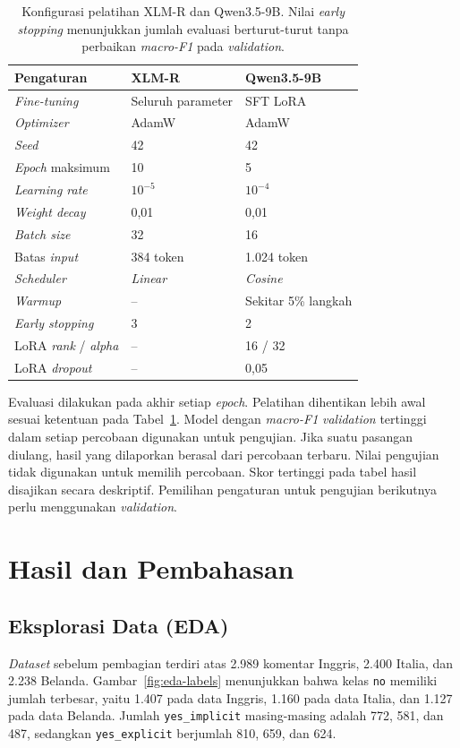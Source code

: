 \documentclass[11pt]{article}
\begin{document}
\begin{table}[t]
\centering
\small
\begin{tabular}{lll}
\toprule
Pengaturan & XLM-R & Qwen3.5-9B \\
\midrule
\textit{Fine-tuning} & Seluruh parameter & SFT LoRA \\
\textit{Optimizer} & AdamW & AdamW \\
\textit{Seed} & 42 & 42 \\
\textit{Epoch} maksimum & 10 & 5 \\
\textit{Learning rate} & $10^{-5}$ & $10^{-4}$ \\
\textit{Weight decay} & 0,01 & 0,01 \\
\textit{Batch size} & 32 & 16 \\
Batas \textit{input} & 384 token & 1.024 token \\
\textit{Scheduler} & \textit{Linear} & \textit{Cosine} \\
\textit{Warmup} & -- & Sekitar 5\% langkah \\
\textit{Early stopping} & 3 & 2 \\
LoRA \textit{rank} / \textit{alpha} & -- & 16 / 32 \\
LoRA \textit{dropout} & -- & 0,05 \\
\bottomrule
\end{tabular}
\caption{Konfigurasi pelatihan XLM-R dan Qwen3.5-9B. Nilai \textit{early stopping} menunjukkan jumlah evaluasi berturut-turut tanpa perbaikan \textit{macro-F1} pada \textit{validation}.}
\label{tab:configuration}
\end{table}

Evaluasi dilakukan pada akhir setiap \textit{epoch}. Pelatihan dihentikan lebih awal sesuai ketentuan pada Tabel~\ref{tab:configuration}. Model dengan \textit{macro-F1} \textit{validation} tertinggi dalam setiap percobaan digunakan untuk pengujian. Jika suatu pasangan diulang, hasil yang dilaporkan berasal dari percobaan terbaru. Nilai pengujian tidak digunakan untuk memilih percobaan. Skor tertinggi pada tabel hasil disajikan secara deskriptif. Pemilihan pengaturan untuk pengujian berikutnya perlu menggunakan \textit{validation}.

\section{Hasil dan Pembahasan}
\subsection{Eksplorasi Data (EDA)}
\textit{Dataset} sebelum pembagian terdiri atas 2.989 komentar Inggris, 2.400 Italia, dan 2.238 Belanda. Gambar~\ref{fig:eda-labels} menunjukkan bahwa kelas \texttt{no} memiliki jumlah terbesar, yaitu 1.407 pada data Inggris, 1.160 pada data Italia, dan 1.127 pada data Belanda. Jumlah \texttt{yes\_implicit} masing-masing adalah 772, 581, dan 487, sedangkan \texttt{yes\_explicit} berjumlah 810, 659, dan 624.
\end{document}
